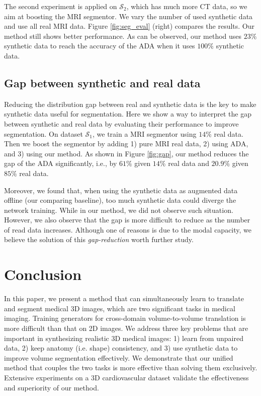 \documentclass[10pt,twocolumn,letterpaper]{article}
\begin{document}
The second experiment is applied on $\mathcal{S}_2$, which has much more CT data, so we aim at boosting the MRI segmentor. We vary the number of used synthetic data and use all real MRI data. Figure \ref{fig:seg_eval} (right) compares the results.  Our method still shows better performance. As can be observed, our method uses $23\%$ synthetic data to reach the accuracy of the ADA when it uses $100\%$ synthetic data. 


\vspace{-.2cm}
\subsection{Gap between synthetic and real data}
Reducing the distribution gap between real and synthetic data is the key to make synthetic data useful for segmentation. 
Here we show a way to interpret the gap between synthetic and real data by evaluating their performance to improve segmentation. On dataset $\mathcal{S}_1$,
we train a MRI segmentor using $14\%$ real data. Then we boost the segmentor by adding 1) pure MRI real data, 2) using ADA, and 3) using our method. 
As shown in Figure \ref{fig:gap}, our method reduces the gap of the ADA significantly, i.e., by $61\%$ given $14\%$ real data and $20.9\%$ given $85\%$ real data.

Moreover, we found that, when using the synthetic data as augmented data offline (our comparing baseline), too much synthetic data could diverge the network training. While in our method, we did not observe such situation. However, we also observe that the gap is more difficult to reduce as the number of read data increases. Although one of reasons is due to the modal capacity, we believe the solution of this \textit{gap-reduction} worth further study. 


\vspace{-.1cm}
\section{Conclusion}
In this paper, we present a method that can simultaneously learn to translate and segment medical 3D images, which are two significant tasks in medical imaging. Training generators for cross-domain volume-to-volume translation is more difficult than that on 2D images. We address three key problems that are important in synthesizing realistic 3D medical images: 1) learn from unpaired data, 2) keep anatomy (i.e. shape) consistency, and 3) use synthetic data to improve volume segmentation effectively. We demonstrate that our unified method that couples the two tasks is more effective than solving them exclusively. Extensive experiments on a 3D cardiovascular dataset validate the effectiveness and superiority of our method. 


{\small


}
\end{document}
